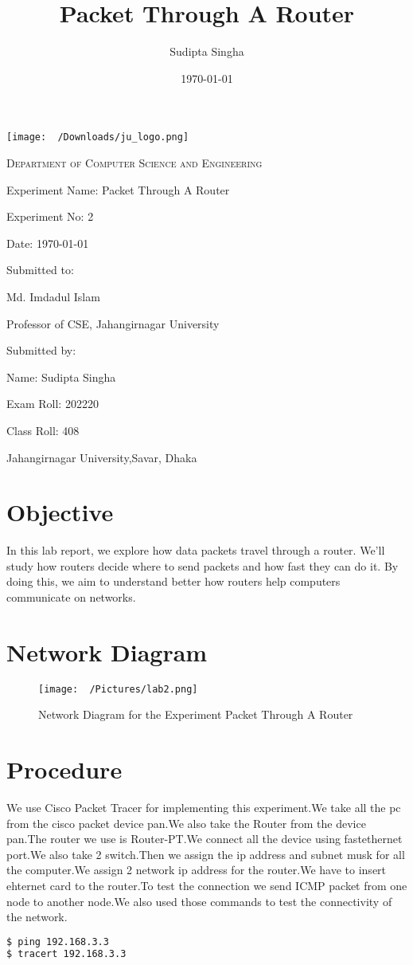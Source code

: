 \documentclass{article}
\title{Packet Through A Router}
\author{Sudipta Singha}
\date{\today}
\newcommand{\frontpage}[6]{%
    \begin{titlepage}
        \centering
        \texttt{[image: ~/Downloads/ju\_logo.png]}\par\vspace{1cm}
        \vspace{1cm}
        {\scshape\Large Department of Computer Science and Engineering\par}
        \vspace{1.5cm}
        \vspace{0.5cm}
        {\Large Experiment Name: #4\par}
        \vspace{0.5cm}
        {\Large Experiment No: #5\par}
        \vspace{0.5cm}
        {\Large Date: #6\par}
        \vfill
        Submitted to:\par
        Md. Imdadul Islam\par
        Professor of CSE, Jahangirnagar University\par
        \vspace{0.5cm}
        Submitted by:\par
        Name: #1\par
        Exam Roll: #2\par
        Class Roll: #3\par
        \vspace{1cm}
        Jahangirnagar University,Savar, Dhaka\par
        \vfill
    \end{titlepage}
}
\begin{document}
\frontpage{Sudipta Singha}{202220}{408}{Packet Through A Router}{2}{\today}


\section{Objective}
In this lab report, we explore how data packets travel through a router. We'll study how routers decide where to send packets and how fast they can do it. By doing this, we aim to understand better how routers help computers communicate on networks.
\section{Network Diagram}
\begin{figure}[H]
    \centering
    \texttt{[image: ~/Pictures/lab2.png]}
    \caption{Network Diagram for the Experiment Packet Through A Router}
\end{figure}

\section{Procedure}
We use Cisco Packet Tracer for implementing this experiment.We take all the pc from the cisco packet device
pan.We also take the Router from the device pan.The router we use is Router-PT.We connect all the device using
fastethernet port.We also take 2 switch.Then we assign the ip address and subnet musk for all the computer.We
assign 2 network ip address for the router.We have to insert ehternet card to the router.To test the
connection we send ICMP packet from one node to another node.We also used those commands to test the
connectivity of the network.
\begin{lstlisting}[language=bash]
$ ping 192.168.3.3
$ tracert 192.168.3.3
\end{lstlisting}
\end{document}
